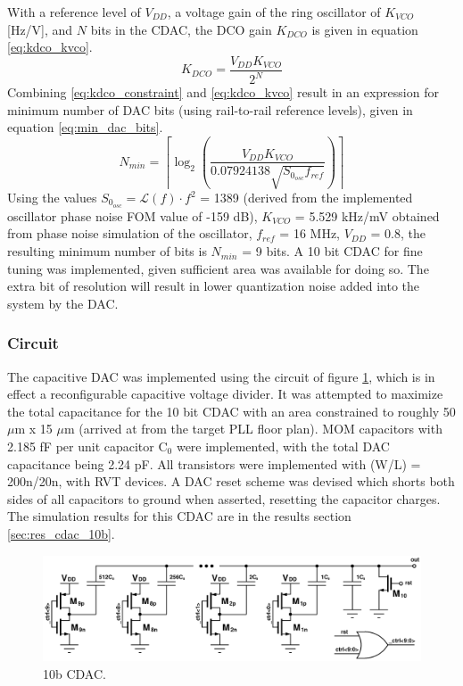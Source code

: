 	With a reference level of $V_{DD}$, a voltage gain of the ring oscillator of $K_{VCO}$ [Hz/V], and $N$ bits in the CDAC, the DCO gain $K_{DCO}$ is given in equation \ref{eq:kdco_kvco}.
	\begin{equation}\label{eq:kdco_kvco}
		K_{DCO} = \frac{V_{DD}K_{VCO}}{2^N}
	\end{equation}
	Combining \ref{eq:kdco_constraint} and \ref{eq:kdco_kvco} result in an expression for minimum number of DAC bits (using rail-to-rail reference levels), given in equation \ref{eq:min_dac_bits}.
	\begin{equation}\label{eq:min_dac_bits}
		N_{min} = \left\lceil \log_2\left( \frac{V_{DD}K_{VCO}}{0.07924138\sqrt{S_{0_{osc}} f_{ref}}} \right)\right\rceil
	\end{equation}
	Using the values $S_{0_{osc}} = \mathcal{L}(f)\cdot f^2$ = 1389 (derived from the implemented oscillator phase noise FOM value of -159 dB), $K_{VCO}$ = 5.529 kHz/mV obtained from phase noise simulation of the oscillator, $f_{ref}$ = 16 MHz, $V_{DD}$ = 0.8, the resulting minimum number of bits is $N_{min}$ = 9 bits.  A 10 bit CDAC for fine tuning was implemented, given sufficient area was available for doing so. The extra bit of resolution will result in lower quantization noise added into the system by the DAC.

		\subsubsection{Circuit}
		The capacitive DAC was implemented using the circuit of figure \ref{fig:10b_cdac_cir}, which is in effect a reconfigurable capacitive voltage divider. It was attempted to maximize the total capacitance for the 10 bit CDAC with an area constrained to roughly 50 $\mu$m x 15 $\mu$m (arrived at from the target PLL floor plan). MOM capacitors with 2.185 fF per unit capacitor C$_0$ were implemented, with the total DAC capacitance being 2.24 pF. All transistors were implemented with (W/L) = 200n/20n, with RVT devices. A DAC reset scheme was devised which shorts both sides of all capacitors to ground when asserted, resetting the capacitor charges. The simulation results for this CDAC are in the results section \ref{sec:res_cdac_10b}.
	
			\begin{figure}[htb!]
			        \centering
			        \includegraphics[width=\textwidth, angle=0]{./figs/design/cdac_10b}
			    \caption{10b CDAC.}
			    \label{fig:10b_cdac_cir}
			\end{figure}

